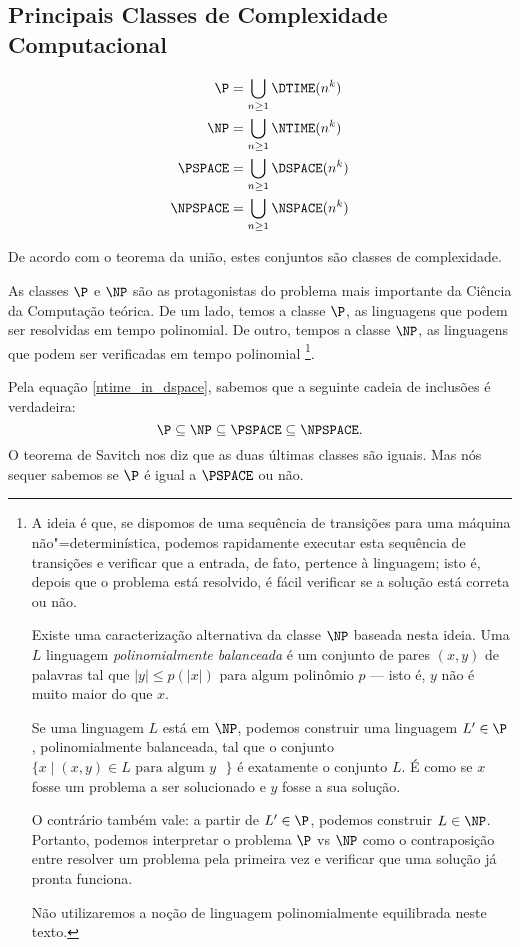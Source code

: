 \subsection{Principais Classes de Complexidade Computacional}
\label{principais_classes}

\begin{definition}
    \begin{align*}
        \P &= \bigcup_{n \geq 1} \DTIME(n^k) \\
        \NP &= \bigcup_{n \geq 1} \NTIME(n^k) \\
        \PSPACE &= \bigcup_{n \geq 1} \DSPACE(n^k) \\
        \NPSPACE &= \bigcup_{n \geq 1} \NSPACE(n^k) \\
    \end{align*}
\end{definition}

De acordo com o teorema da união,
estes conjuntos são classes de complexidade.

As classes $\P$ e $\NP$ são as protagonistas
do problema mais importante da Ciência da Computação teórica.
De um lado, temos a classe $\P$,
as linguagens que podem ser resolvidas em tempo polinomial.
De outro, tempos a classe $\NP$,
as linguagens que podem ser verificadas em tempo polinomial%
\footnote{
    A ideia é que,
    se dispomos de uma sequência de transições para uma máquina não"=determinística,
    podemos rapidamente executar esta sequência de transições
    e verificar que a entrada, de fato, pertence à linguagem;
    isto é, depois que o problema está resolvido,
    é fácil verificar se a solução está correta ou não.

    Existe uma caracterização alternativa da classe $\NP$ baseada nesta ideia.
    Uma $L$ linguagem \emph{polinomialmente balanceada}
    é um conjunto de pares $(x, y)$ de palavras
    tal que $|y| \leq p(|x|)$ para algum polinômio $p$
    \cite[p. 298]{Papadimitriou1998}
    --- isto é, $y$ não é muito maior do que $x$.

    Se uma linguagem $L$ está em $\NP$,
    podemos construir uma linguagem $L' \in \P$,
    polinomialmente balanceada,
    tal que o conjunto $\{x \mid (x, y) \in L \text{ para algum $y$ }\}$
    é exatamente o conjunto $L$.
    É como se $x$ fosse um problema a ser solucionado
    e $y$ fosse a sua solução.

    O contrário também vale: a partir de $L' \in \P$,
    podemos construir $L \in \NP$.
    Portanto, podemos interpretar o problema $\P$ vs $\NP$
    como o contraposição entre resolver um problema pela primeira vez
    e verificar que uma solução já pronta funciona.

    Não utilizaremos a noção de linguagem polinomialmente equilibrada neste texto.
}.

Pela equação \ref{ntime_in_dspace},
sabemos que a seguinte cadeia de inclusões é verdadeira:
\begin{equation*}
    \P \subseteq \NP \subseteq \PSPACE \subseteq \NPSPACE.
\end{equation*}
O teorema de Savitch nos diz que as duas últimas classes são iguais.
Mas nós sequer sabemos se $\P$ é igual a $\PSPACE$ ou não.
